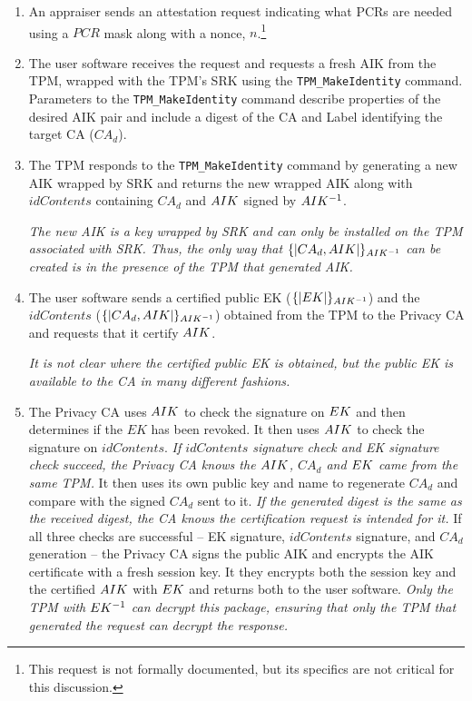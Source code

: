 \documentclass[10pt]{article}
\begin{document}
\begin{enumerate}
  \parskip=0pt\itemsep=0pt
\item An appraiser sends an attestation request indicating what PCRs
  are needed using a $PCR$ mask along with a nonce, $n$.\footnote{This
  request is not formally documented, but its specifics are not
  critical for this discussion.}

\item The user software receives the request and requests a fresh AIK
  from the TPM, wrapped with the TPM's SRK using the
  \verb+TPM_MakeIdentity+ command.  Parameters to the
  \verb+TPM_MakeIdentity+ command describe properties of the desired
  AIK pair and include a digest of the CA and Label identifying the
  target CA ($CA_d$).  

\item The TPM responds to the \verb+TPM_MakeIdentity+ command by
  generating a new AIK wrapped by SRK and returns the new wrapped AIK
  along with $idContents$ containing $CA_d$ and $AIK$ signed
  by $AIK^{-1}$.

  \emph{The new AIK is a key wrapped by SRK and can only be installed
    on the TPM associated with SRK.  Thus, the only way that
    $\{|CA_d,AIK|\}_{AIK^{-1}}$ can be created is in the presence
    of the TPM that generated AIK.}

\item The user software sends a certified public EK ($\{|EK|\}_{AIK^{-1}}$)
  and the $idContents$ ($\{|CA_d,AIK|\}_{AIK^{-1}}$) obtained from
  the TPM to the Privacy CA and requests that it certify
  $AIK$.

  \emph{It is not clear where the certified public EK is obtained, but
    the public EK is available to the CA in many different fashions.}

\item The Privacy CA uses $AIK$ to check the signature on
  $EK$ and then determines if the $EK$ has been revoked.  It
  then uses $AIK$ to check the signature on
  $idContents$. \emph{If $idContents$ signature check and EK signature
    check succeed, the Privacy CA knows the $AIK$, $CA_d$ and
    $EK$ came from the same TPM.}  It then uses its own
  public key and name to regenerate $CA_d$ and compare with the signed
  $CA_d$ sent to it.  \emph{If the generated digest is the same as the
    received digest, the CA knows the certification request is
    intended for it.} If all three checks are successful -- EK
  signature, $idContents$ signature, and $CA_d$ generation -- the
  Privacy CA signs the public AIK and encrypts the AIK certificate
  with a fresh session key.  It they encrypts both the session key and
  the certified $AIK$ with $EK$ and returns both to
  the user software.  \emph{Only the TPM with $EK^{-1}$ can
    decrypt this package, ensuring that only the TPM that generated
    the request can decrypt the response.}


\end{enumerate}
\end{document}

